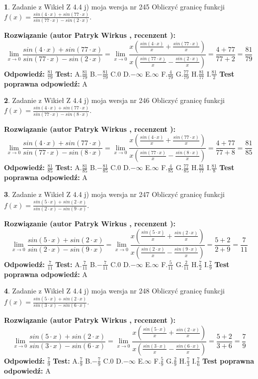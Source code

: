 \documentclass[12pt, a4paper]{article}
\theoremstyle{definition} %
\newtheorem{zad}{}
\newcommand{\zadStart}[1]{\begin{zad}#1\newline}
\newcommand{\zadStop}{\end{zad}}
\newcommand{\rozwStart}[2]{\noindent \textbf{Rozwiązanie (autor #1 , recenzent #2): }\newline}
\newcommand{\rozwStop}{\newline}
\newcommand{\odpStart}{\noindent \textbf{Odpowiedź:}\newline}
\newcommand{\odpStop}{\newline}
\newcommand{\testStart}{\noindent \textbf{Test:}\newline}
\newcommand{\testStop}{\newline}
\newcommand{\kluczStart}{\noindent \textbf{Test poprawna odpowiedź:}\newline}
\newcommand{\kluczStop}{\newline}
\begin{document}
\zadStart{Zadanie z Wikieł Z 4.4 j) moja wersja nr 245}
Obliczyć granicę funkcji $f(x)=\frac{sin(4\cdot x) +sin(77\cdot x)}{sin(77\cdot x) -sin(2\cdot x)}$.
\zadStop
\rozwStart{Patryk Wirkus}{}
$$\lim\limits_{x\to 0}\frac{sin(4\cdot x) +sin(77\cdot x)}{sin(77\cdot x) -sin(2\cdot x)}=\lim\limits_{x\to 0}\frac{x(\frac{sin(4\cdot x)}{x}+\frac{sin(77\cdot x)}{x})}{x(\frac{sin(77\cdot x)}{x}-\frac{sin(2\cdot x)}{x})}=\frac{4+77}{77+2} = \frac{81}{79}$$
\rozwStop
\odpStart
$\frac{81}{79}$
\odpStop
\testStart
A.$\frac{81}{79}$
B.$-\frac{81}{79}$
C.$0$
D.$-\infty$
E.$\infty$
F.$\frac{4}{79}$
G.$\frac{77}{79}$
H.$\frac{81}{77}$
I.$\frac{81}{2}$
\testStop
\kluczStart
A
\kluczStop



\zadStart{Zadanie z Wikieł Z 4.4 j) moja wersja nr 246}
Obliczyć granicę funkcji $f(x)=\frac{sin(4\cdot x) +sin(77\cdot x)}{sin(77\cdot x) -sin(8\cdot x)}$.
\zadStop
\rozwStart{Patryk Wirkus}{}
$$\lim\limits_{x\to 0}\frac{sin(4\cdot x) +sin(77\cdot x)}{sin(77\cdot x) -sin(8\cdot x)}=\lim\limits_{x\to 0}\frac{x(\frac{sin(4\cdot x)}{x}+\frac{sin(77\cdot x)}{x})}{x(\frac{sin(77\cdot x)}{x}-\frac{sin(8\cdot x)}{x})}=\frac{4+77}{77+8} = \frac{81}{85}$$
\rozwStop
\odpStart
$\frac{81}{85}$
\odpStop
\testStart
A.$\frac{81}{85}$
B.$-\frac{81}{85}$
C.$0$
D.$-\infty$
E.$\infty$
F.$\frac{4}{85}$
G.$\frac{77}{85}$
H.$\frac{81}{77}$
I.$\frac{81}{8}$
\testStop
\kluczStart
A
\kluczStop



\zadStart{Zadanie z Wikieł Z 4.4 j) moja wersja nr 247}
Obliczyć granicę funkcji $f(x)=\frac{sin(5\cdot x) +sin(2\cdot x)}{sin(2\cdot x) -sin(9\cdot x)}$.
\zadStop
\rozwStart{Patryk Wirkus}{}
$$\lim\limits_{x\to 0}\frac{sin(5\cdot x) +sin(2\cdot x)}{sin(2\cdot x) -sin(9\cdot x)}=\lim\limits_{x\to 0}\frac{x(\frac{sin(5\cdot x)}{x}+\frac{sin(2\cdot x)}{x})}{x(\frac{sin(2\cdot x)}{x}-\frac{sin(9\cdot x)}{x})}=\frac{5+2}{2+9} = \frac{7}{11}$$
\rozwStop
\odpStart
$\frac{7}{11}$
\odpStop
\testStart
A.$\frac{7}{11}$
B.$-\frac{7}{11}$
C.$0$
D.$-\infty$
E.$\infty$
F.$\frac{5}{11}$
G.$\frac{2}{11}$
H.$\frac{7}{2}$
I.$\frac{7}{9}$
\testStop
\kluczStart
A
\kluczStop



\zadStart{Zadanie z Wikieł Z 4.4 j) moja wersja nr 248}
Obliczyć granicę funkcji $f(x)=\frac{sin(5\cdot x) +sin(2\cdot x)}{sin(3\cdot x) -sin(6\cdot x)}$.
\zadStop
\rozwStart{Patryk Wirkus}{}
$$\lim\limits_{x\to 0}\frac{sin(5\cdot x) +sin(2\cdot x)}{sin(3\cdot x) -sin(6\cdot x)}=\lim\limits_{x\to 0}\frac{x(\frac{sin(5\cdot x)}{x}+\frac{sin(2\cdot x)}{x})}{x(\frac{sin(3\cdot x)}{x}-\frac{sin(6\cdot x)}{x})}=\frac{5+2}{3+6} = \frac{7}{9}$$
\rozwStop
\odpStart
$\frac{7}{9}$
\odpStop
\testStart
A.$\frac{7}{9}$
B.$-\frac{7}{9}$
C.$0$
D.$-\infty$
E.$\infty$
F.$\frac{5}{9}$
G.$\frac{2}{9}$
H.$\frac{7}{3}$
I.$\frac{7}{6}$
\testStop
\kluczStart
A
\kluczStop
\end{document}
